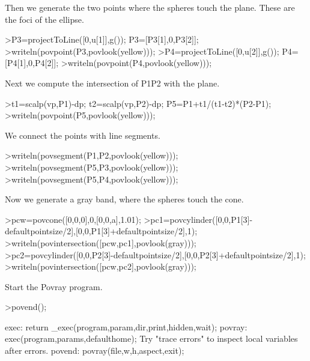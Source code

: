 \documentclass[a4paper,10pt]{article}
\begin{document}
\begin{eulernotebook}
\begin{eulercomment}
\begin{eulercomment}
\begin{eulercomment}
\begin{eulercomment}
\begin{eulercomment}
\begin{eulercomment}
\begin{eulercomment}
Then we generate the two points where the spheres touch the plane.
These are the foci of the ellipse.
\end{eulercomment}
\begin{eulerprompt}
>P3=projectToLine([0,u[1]],g()); P3=[P3[1],0,P3[2]];
>writeln(povpoint(P3,povlook(yellow)));
>P4=projectToLine([0,u[2]],g()); P4=[P4[1],0,P4[2]];
>writeln(povpoint(P4,povlook(yellow)));
\end{eulerprompt}
\begin{eulercomment}
Next we compute the intersection of P1P2 with the plane.
\end{eulercomment}
\begin{eulerprompt}
>t1=scalp(vp,P1)-dp; t2=scalp(vp,P2)-dp; P5=P1+t1/(t1-t2)*(P2-P1);
>writeln(povpoint(P5,povlook(yellow)));
\end{eulerprompt}
\begin{eulercomment}
We connect the points with line segments.
\end{eulercomment}
\begin{eulerprompt}
>writeln(povsegment(P1,P2,povlook(yellow)));
>writeln(povsegment(P5,P3,povlook(yellow)));
>writeln(povsegment(P5,P4,povlook(yellow)));
\end{eulerprompt}
\begin{eulercomment}
Now we generate a gray band, where the spheres touch the cone.
\end{eulercomment}
\begin{eulerprompt}
>pcw=povcone([0,0,0],0,[0,0,a],1.01);
>pc1=povcylinder([0,0,P1[3]-defaultpointsize/2],[0,0,P1[3]+defaultpointsize/2],1);
>writeln(povintersection([pcw,pc1],povlook(gray)));
>pc2=povcylinder([0,0,P2[3]-defaultpointsize/2],[0,0,P2[3]+defaultpointsize/2],1);
>writeln(povintersection([pcw,pc2],povlook(gray)));
\end{eulerprompt}
\begin{eulercomment}
Start the Povray program.
\end{eulercomment}
\begin{eulerprompt}
>povend();
\end{eulerprompt}
\begin{euleroutput}
  exec:
      return _exec(program,param,dir,print,hidden,wait);
  povray:
      exec(program,params,defaulthome);
  Try "trace errors" to inspect local variables after errors.
  povend:
      povray(file,w,h,aspect,exit); 
\end{euleroutput}
\begin{eulercomment}

\end{eulercomment}
\end{eulercomment}
\end{eulercomment}
\end{eulercomment}
\end{eulercomment}
\end{eulercomment}
\end{eulercomment}
\end{eulernotebook}
\end{document}

